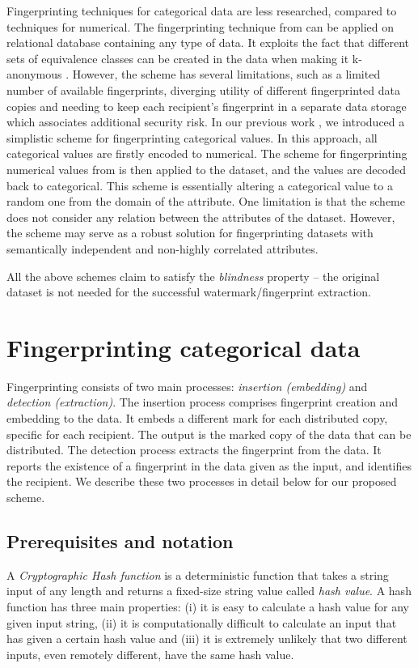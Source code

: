 \documentclass[runningheads]{llncs}
\begin{document}
Fingerprinting techniques for categorical data are less researched, compared to techniques for numerical.
The fingerprinting technique from \cite{Kieseberg2014fingerprinting} can be applied on relational database containing any type of data.
It exploits the fact that different sets of equivalence classes can be created in the data when making it k-anonymous \cite{sweeney2002k}.%
However, the scheme has several limitations, such as a limited number of available fingerprints, diverging utility of different fingerprinted data copies and needing to keep each recipient’s fingerprint in a separate data storage which associates additional security risk. 
In our previous work \cite{sarcevic19_fingerprinting}, we introduced a simplistic scheme for fingerprinting categorical values. 
In this approach, all categorical values are firstly encoded to numerical. 
The scheme for fingerprinting numerical values from \cite{li2005fingerprinting} is then applied to the dataset, and the values are decoded back to categorical. 
This scheme is essentially altering a categorical value to a random one from the domain of the attribute. 
One limitation is that the scheme does not consider any relation between the attributes of the dataset. However, the scheme may serve as a robust solution for fingerprinting datasets with semantically independent and non-highly correlated attributes.

All the above schemes claim to satisfy the \textit{blindness} property -- the original dataset is not needed for the successful watermark/fingerprint extraction. 

\section{Fingerprinting categorical data}\label{sec:scheme}
Fingerprinting consists of two main processes: \textit{insertion (embedding)} and \textit{detection (extraction)}.
The insertion process comprises fingerprint creation and embedding to the data.
It embeds a different mark for each distributed copy, specific for each recipient.
The output is the marked copy of the data that can be distributed.
The detection process extracts the fingerprint from the data.
It reports the existence of a fingerprint in the data given as the input, and identifies the recipient.
We describe these two processes in detail below for our proposed scheme.

\subsection{Prerequisites and notation}
A \textit{Cryptographic Hash function} is a deterministic function that takes a string input of any length and returns a fixed-size string value called \textit{hash value}. A hash function has three main properties: (i) it is easy to calculate a hash value for any given input string, (ii) it is computationally difficult to calculate an input that has given a certain hash value and (iii) it is extremely unlikely that two different inputs, even remotely different, have the same hash value.
\end{document}
